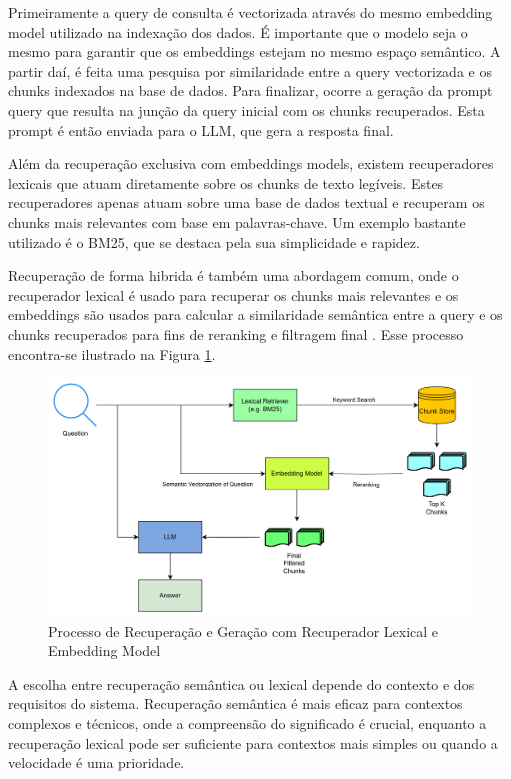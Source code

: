 Primeiramente a query de consulta é vectorizada através do mesmo embedding model utilizado na indexação dos dados. É importante que o modelo seja o mesmo para garantir que os embeddings estejam no mesmo espaço semântico. A partir daí, é feita uma pesquisa por similaridade entre a query vectorizada e os chunks indexados na base de dados. Para finalizar, ocorre a geração da prompt query que resulta na junção da query inicial com os chunks recuperados. Esta prompt é então enviada para o LLM, que gera a resposta final.

Além da recuperação exclusiva com embeddings models, existem recuperadores lexicais que atuam diretamente sobre os chunks de texto legíveis. Estes recuperadores apenas atuam sobre uma base de dados textual e recuperam os chunks mais relevantes com base em palavras-chave. Um exemplo bastante utilizado é o BM25, que se destaca pela sua simplicidade e rapidez. 

Recuperação de forma hibrida é também uma abordagem comum, onde o recuperador lexical é usado para recuperar os chunks mais relevantes e os embeddings são usados para calcular a similaridade semântica entre a query e os chunks recuperados para fins de reranking e filtragem final \parencite{gupta2024comprehensive, kamalloo2023evaluating}. Esse processo encontra-se ilustrado na Figura \ref{fig:acrh-bm25}.


\begin{figure}[H]
        \centering
        \includegraphics[width=1\linewidth]{ch3/assets/arq-bm25.png}
        \caption{Processo de Recuperação e Geração com Recuperador Lexical e Embedding Model}
        \label{fig:acrh-bm25}
\end{figure}


A escolha entre recuperação semântica ou lexical depende do contexto e dos requisitos do sistema. Recuperação semântica é mais eficaz para contextos complexos e técnicos, onde a compreensão do significado é crucial, enquanto a recuperação lexical pode ser suficiente para contextos mais simples ou quando a velocidade é uma prioridade.


